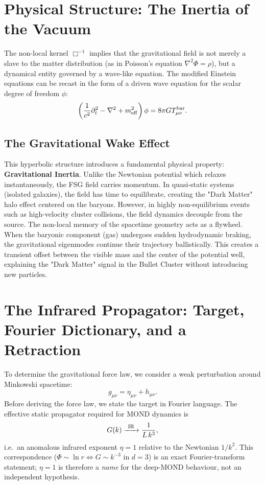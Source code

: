\documentclass[11pt,a4paper]{article}
\begin{document}
\begin{onehalfspacing}
\section{Physical Structure: The Inertia of the Vacuum}
The non-local kernel $\Box^{-1}$ implies that the gravitational field is not merely a slave to the matter distribution (as in Poisson's equation $\nabla^2 \Phi = \rho$), but a dynamical entity governed by a wave-like equation.
The modified Einstein equations can be recast in the form of a driven wave equation for the scalar degree of freedom $\phi$:
\begin{equation}
\left( \frac{1}{c^2}\partial_t^2 - \nabla^2 + m_{\rm eff}^2 \right) \phi = 8\pi G T_{\mu\nu}^{\rm bar}.
\label{eq:wave_eqn}
\end{equation}
\subsection{The Gravitational Wake Effect}
This hyperbolic structure introduces a fundamental physical property: \textbf{Gravitational Inertia}.
Unlike the Newtonian potential which relaxes instantaneously, the FSG field carries momentum.
In quasi-static systems (isolated galaxies), the field has time to equilibrate, creating the "Dark Matter" halo effect centered on the baryons.
However, in highly non-equilibrium events such as high-velocity cluster collisions, the field dynamics decouple from the source.
The non-local memory of the spacetime geometry acts as a flywheel. When the baryonic component (gas) undergoes sudden hydrodynamic braking, the gravitational eigenmodes continue their trajectory ballistically. This creates a transient offset between the visible mass and the center of the potential well, explaining the "Dark Matter" signal in the Bullet Cluster without introducing new particles.
\section{The Infrared Propagator: Target, Fourier Dictionary, and a Retraction}
To determine the gravitational force law, we consider a weak perturbation around Minkowski spacetime:
\[
g_{\mu\nu} = \eta_{\mu\nu} + h_{\mu\nu}.
\]
Before deriving the force law, we state the target in Fourier language. The effective static propagator required for MOND dynamics is
\begin{equation}
G(k) \xrightarrow{\ \rm IR\ } \frac{1}{L\,k^{3}},
\label{eq:Gk3}
\end{equation}
i.e.\ an anomalous infrared exponent $\eta = 1$ relative to the Newtonian $1/k^2$. This correspondence ($\Phi \sim \ln r \Leftrightarrow G \sim k^{-3}$ in $d=3$) is an exact Fourier-transform statement; $\eta = 1$ is therefore a \emph{name} for the deep-MOND behaviour, not an independent hypothesis.

\end{onehalfspacing}
\end{document}
